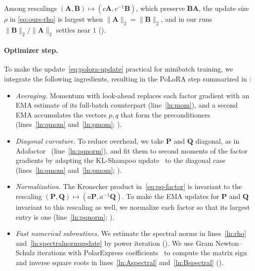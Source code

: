 \documentclass{article}
\newcommand{\mat}[1]{\bm{#1}}
\newcommand{\norm}[1]{\| #1\|}
\newcommand{\methodname}{PoLoRA\xspace}
\begin{document}
Among rescalings $(\mat{A},\mat{B})\mapsto(c\mat{A},c^{-1}\mat{B})$, which preserve $\mat{B}\mat{A}$, the update size $\rho$ in \eqref{eq:ours-rho} is largest when $\norm{\mat{A}}_2=\norm{\mat{B}}_2$, and in our runs $\norm{\mat{B}}_2/\norm{\mat{A}}_2$ settles near $1$ ().

\paragraph{Optimizer step.}
To make the update~\eqref{eq:polora-update} practical for minibatch training, we integrate the following ingredients, resulting in the \methodname{} step summarized in :
\begin{itemize}[leftmargin=1.5em,itemsep=1pt,topsep=2pt]
  \item \emph{Averaging.} Momentum with look-ahead replaces each factor gradient with an EMA estimate of its full-batch counterpart (line~\ref{ln:mom}), and a second EMA accumulates the vectors $p,q$ that form the preconditioners (lines~\ref{ln:qmom} and~\ref{ln:pmom}; ).  \item \emph{Diagonal curvature.} To reduce overhead, we take $\mat{P}$ and $\mat{Q}$ diagonal, as in Adafactor~\cite{adafactor} (line~\ref{ln:pqnorm}), and fit them to second moments of the factor gradients by adapting the KL-Shampoo update~\cite{klshampoo} to the diagonal case (lines~\ref{ln:qmom} and~\ref{ln:pmom}; ).
  \item \emph{Normalization.} The Kronecker product in~\eqref{eq:pq-factor} is invariant to the rescaling $(\mat{P},\mat{Q})\mapsto(a\mat{P},a^{-1}\mat{Q})$. To make the EMA updates for $\mat{P}$ and $\mat{Q}$ invariant to this rescaling as well, we normalize each factor so that its largest entry is one (line~\ref{ln:pqnorm}; ).
  \item \emph{Fast numerical subroutines.} We estimate the spectral norms in lines~\ref{ln:rho} and~\ref{ln:spectralnormupdate} by power iteration (). We use Gram Newton--Schulz iterations with PolarExpress coefficients~\cite{polarexpress} to compute the matrix sign and inverse square roots in lines~\ref{ln:Aspectral} and~\ref{ln:Bspectral} ().
\end{itemize}
\end{document}
